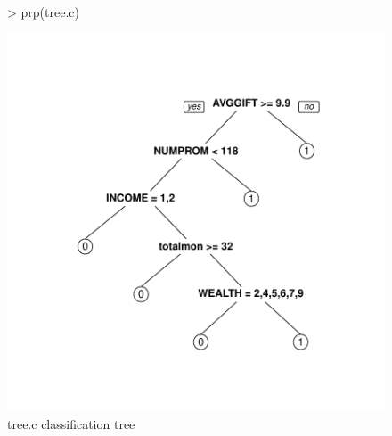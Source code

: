 \documentclass{article}
\begin{document}
\begin{figure}
\begin{center}
\begin{Schunk}
\begin{Sinput}
> prp(tree.c)
\end{Sinput}
\end{Schunk}
\includegraphics{DirectMailPrediction-019}
\end{center}
\caption{tree.c classification tree}
\label{classt-c}
\end{figure}
\end{document}
